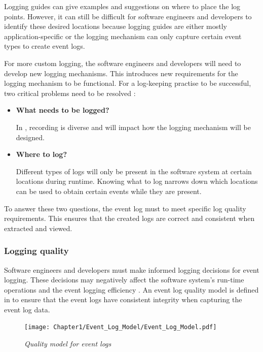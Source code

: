 Logging guides can give examples and suggestions on where to place the log points. However, it can still be difficult for software engineers and developers to identify these desired locations because logging guides are either mostly application-specific or the logging mechanism can only capture certain event types to create event logs. \par For more custom logging, the software engineers and developers will need to develop new logging mechanisms. This introduces new requirements for the logging mechanism to be functional. For a log-keeping practise to be successful, two critical problems need to be resolved \cite{Zhu2015, Zhu2019, Rong2018}:

\begin{itemize}
	\item \textbf{What needs to be logged?}\par In , recording is diverse and will impact how the logging mechanism will be designed.
	\item \textbf{Where to log?} \par Different types of logs will only be present in the software system at certain locations during runtime. Knowing what to log narrows down which locations can be used to obtain certain events while they are present.
\end{itemize}

To answer these two questions, the event log must to meet specific log quality requirements. This ensures that the created logs are correct and consistent when extracted and viewed. 

\subsubsection{Logging quality}\label{sec:ch1_loggingQuality}

Software engineers and developers must make informed logging decisions for event logging. These decisions may negatively affect the software system's run-time operations and the event logging efficiency \cite{Zhu2015, Zhu2019, Kherbouche2017}. An event log quality model is defined in  to ensure that the event logs have consistent integrity when capturing the event log data.

\begin{figure}[!htb]
	\centering %
	\texttt{[image: Chapter1/Event\_Log\_Model/Event\_Log\_Model.pdf]}
	\caption[Quality model for event logs]
	{\textit{Quality model for event logs \cite{Kherbouche2017}}} \label{fig:ch1_EventQModel}
\end{figure}

